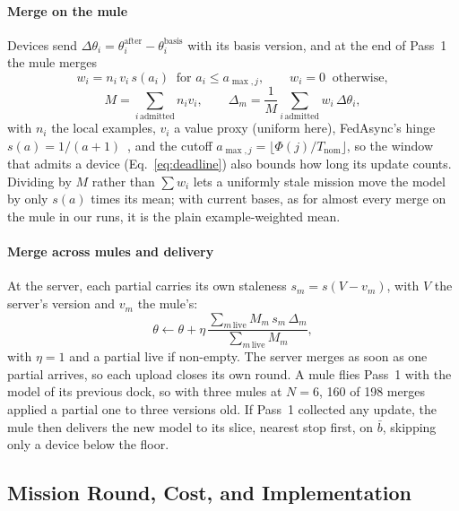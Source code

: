 \documentclass[conference]{IEEEtran}
\newcommand{\bbar}{\bar{b}}
\newcommand{\Tnom}{T_{\mathrm{nom}}}
\begin{document}
\paragraph{Merge on the mule}
Devices send $\Delta\theta_i=\theta_i^{\mathrm{after}}-\theta_i^{\mathrm{basis}}$
with its basis version, and at the end of Pass~1 the mule merges
\begin{equation}
w_i=n_i\,v_i\,s(a_i)\ \text{ for } a_i\le a_{\max,j},\qquad w_i=0\ \text{ otherwise},
\label{eq:mergeweight}
\end{equation}
\begin{equation}
M=\sum_{i\,\text{admitted}}n_iv_i,\qquad
\Delta_m=\frac{1}{M}\sum_{i\,\text{admitted}}w_i\,\Delta\theta_i,
\label{eq:mulemerge}
\end{equation}
with $n_i$ the local examples, $v_i$ a value proxy (uniform here), FedAsync's
hinge $s(a)=1/(a+1)$~\cite{xie2019asynchronous}, and the cutoff
$a_{\max,j}=\lfloor\Phi(j)/\Tnom\rfloor$, so the window that admits a device
(Eq.~\eqref{eq:deadline}) also bounds how long its update counts. Dividing by $M$
rather than $\sum w_i$ lets a uniformly stale mission move the model by only
$s(a)$ times its mean; with current bases, as for almost every merge on the mule
in our runs, it is the plain example-weighted mean.

\paragraph{Merge across mules and delivery}
At the server, each partial carries its own staleness $s_m=s(V-v_m)$, with $V$ the
server's version and $v_m$ the mule's:
\begin{equation}
\theta\leftarrow\theta+\eta\,\frac{\sum_{m\,\text{live}}M_m\,s_m\,\Delta_m}{\sum_{m\,\text{live}}M_m},
\label{eq:clustermerge}
\end{equation}
with $\eta=1$ and a partial live if non-empty. The server merges as soon as one
partial arrives, so each upload closes its own round. A mule flies Pass~1 with
the model of its previous dock, so with three mules at $N=6$, 160 of 198 merges
applied a partial one to three versions old. If Pass~1 collected any update, the
mule then delivers the new model to its slice, nearest stop first, on $\bbar$,
skipping only a device below the floor.

\subsection{Mission Round, Cost, and Implementation}
\label{sec:method:alg}
\end{document}
